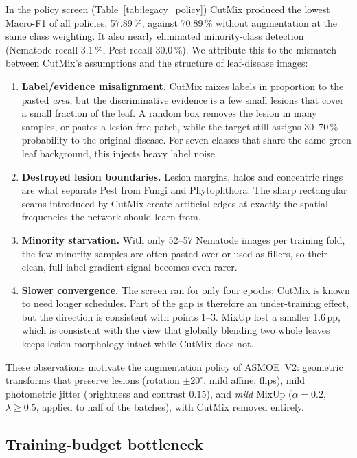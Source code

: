 In the policy screen (Table~\ref{tab:legacy_policy}) CutMix produced the lowest
Macro-F1 of all policies, 57.89\,\%, against 70.89\,\% without augmentation at the
same class weighting. It also nearly eliminated minority-class detection
(Nematode recall 3.1\,\%, Pest recall 30.0\,\%). We attribute this to the
mismatch between CutMix's assumptions and the structure of leaf-disease images:

\begin{enumerate}
  \item \textbf{Label/evidence misalignment.} CutMix mixes labels in proportion
  to the pasted \emph{area}, but the discriminative evidence is a few small
  lesions that cover a small fraction of the leaf. A random box removes the lesion
  in many samples, or pastes a lesion-free patch, while the target still assigns
  30--70\,\% probability to the original disease. For seven classes that share the
  same green leaf background, this injects heavy label noise.
  \item \textbf{Destroyed lesion boundaries.} Lesion margins, halos and
  concentric rings are what separate Pest from Fungi and Phytophthora. The sharp
  rectangular seams introduced by CutMix create artificial edges at exactly the
  spatial frequencies the network should learn from.
  \item \textbf{Minority starvation.} With only 52--57 Nematode images per
  training fold, the few minority samples are often pasted over or used as
  fillers, so their clean, full-label gradient signal becomes even rarer.
  \item \textbf{Slower convergence.} The screen ran for only four epochs; CutMix
  is known to need longer schedules. Part of the gap is therefore an
  under-training effect, but the direction is consistent with points 1--3. MixUp
  lost a smaller 1.6\,pp, which is consistent with the view that
  globally blending two whole leaves keeps lesion morphology intact while CutMix
  does not.
\end{enumerate}

These observations motivate the augmentation policy of ASMOE~V2: geometric
transforms that preserve lesions (rotation $\pm 20^\circ$, mild affine, flips),
mild photometric jitter (brightness and contrast $0.15$), and \emph{mild} MixUp
($\alpha = 0.2$, $\lambda \ge 0.5$, applied to half of the batches), with
CutMix removed entirely.

\subsection{Training-budget bottleneck}
\label{sec:audit_budget}

